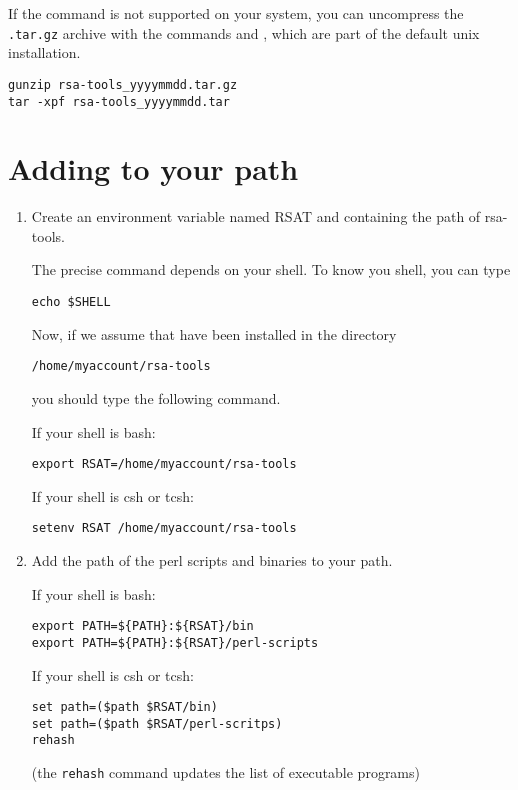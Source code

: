 \documentclass{article}
\begin{document}
If the  command is not supported on your system, you
can uncompress the \texttt{.tar.gz} archive with the commands
 and , which are part of the default unix
installation.

\begin{verbatim}
gunzip rsa-tools_yyyymmdd.tar.gz
tar -xpf rsa-tools_yyyymmdd.tar
\end{verbatim}

\section{Adding \RSAT to your path}

\begin{enumerate}

\item Create an environment variable named RSAT and containing the
  path of rsa-tools. 

The precise command depends on your shell. To know you shell, you can
type
\begin{verbatim}
echo $SHELL
\end{verbatim}

Now, if we assume that \RSAT have been installed in the directory

\begin{verbatim}
/home/myaccount/rsa-tools
\end{verbatim}

you should type the following command.

If your shell is bash:
\begin{verbatim}
export RSAT=/home/myaccount/rsa-tools
\end{verbatim}

If your shell is csh or tcsh:
\begin{verbatim}
setenv RSAT /home/myaccount/rsa-tools
\end{verbatim}



\item Add the path of the \RSAT perl scripts and binaries to your
  path.

If your shell is bash:
\begin{verbatim}
export PATH=${PATH}:${RSAT}/bin
export PATH=${PATH}:${RSAT}/perl-scripts
\end{verbatim}

If your shell is csh or tcsh:
\begin{verbatim}
set path=($path $RSAT/bin)
set path=($path $RSAT/perl-scritps)
rehash
\end{verbatim}

(the \texttt{rehash} command updates the list of executable programs)

\end{enumerate}
\end{document}

